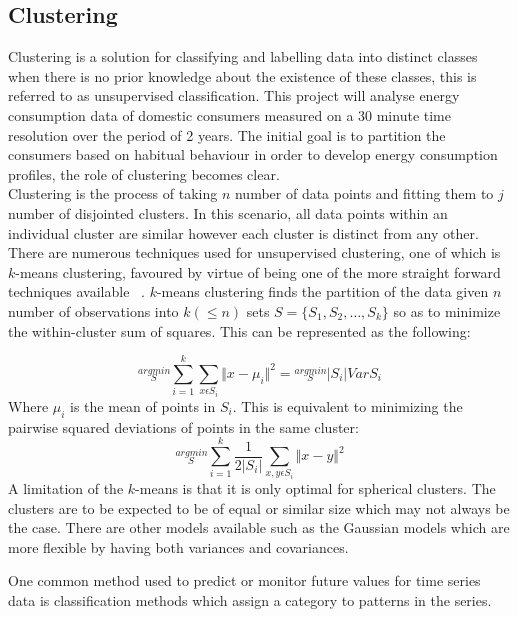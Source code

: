 \subsection{Clustering}
Clustering is a solution for classifying and labelling data into distinct classes when there is no prior knowledge about the existence of these classes, this is referred to as unsupervised classification. This project will analyse energy consumption data of domestic consumers measured on a 30 minute time resolution over the period of 2 years. The initial goal is to partition the consumers based on habitual behaviour in order to develop energy consumption profiles, the role of clustering becomes clear. \\
Clustering is the process of taking $n$ number of data points and fitting them to $j$ number of disjointed clusters. In this scenario, all data points within an individual cluster are similar however each cluster is distinct from any other. There are numerous techniques used for unsupervised clustering, one of which is $k$-means clustering, favoured by virtue of being one of the more straight forward techniques available ~\cite{KMC}. $k$-means clustering finds the partition of the data given $n$ number of observations into $k (\leq n)$ sets $S = \{S_1,S_2, \dots, S_k\}$ so as to minimize the within-cluster sum of squares. This can be represented as the following:

\begin{equation}
\stackrel{arg min}{_{S}} \sum_{i=1}^k \sum_{x \epsilon S_{i}} \Vert x-\mu_{i} \Vert ^{2} = \stackrel{arg min}{_{S}}  |S_{i}|  Var S_{i}
\end{equation}
Where $\mu_{i}$ is the mean of points in $S_i$. This is equivalent to minimizing the pairwise squared deviations of points in the same cluster:
\begin{equation}
\stackrel{arg min}{_{S}} \sum_{i=1}^k \frac{1}{2|S_i|} \sum_{x, y\epsilon S_i}\Vert x- y \Vert ^2
\end{equation}
A limitation of the $k$-means is that it is only optimal for spherical clusters. The clusters are to be expected to be of equal or similar size which may not always be the case. There are other models available such as the Gaussian models which are more flexible by having both variances and covariances.

One common method used to predict or monitor future values for time series data is classification methods which assign a category to patterns in the series. 

